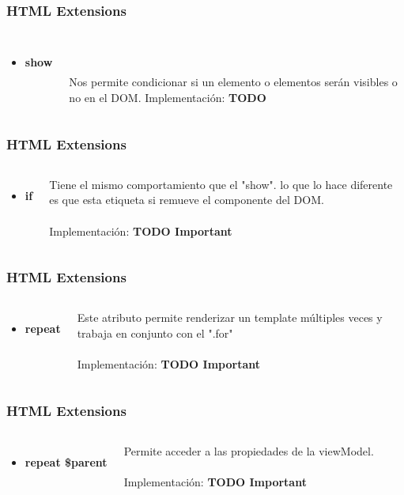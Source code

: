 \documentclass{beamer}
\begin{document}
\begin{frame}
\frametitle{HTML Extensions}
\begin{columns}[c]
\begin{itemize}
\item \textbf{show}
\end{itemize}
\\~\\
Nos permite condicionar si un elemento o elementos ser\'an visibles o no en el DOM.
Implementaci\'on: \textbf{TODO}
\end{columns}
\end{frame}
\begin{frame}
\frametitle{HTML Extensions}
\begin{columns}[c]
\begin{itemize}
\item \textbf{if}
\end{itemize}
Tiene el mismo comportamiento que el "show". lo que lo hace diferente es que esta etiqueta si remueve el componente del DOM.
\\~\\
Implementaci\'on: \textbf{TODO Important}
\end{columns}
\end{frame}
\begin{frame}
\frametitle{HTML Extensions}
\begin{columns}[c]
\begin{itemize}
\item \textbf{repeat}
\end{itemize}
Este atributo permite renderizar un template m\'ultiples veces y trabaja en conjunto con el ".for"
\\~\\
Implementaci\'on: \textbf{TODO Important}
\end{columns}
\end{frame}
\begin{frame}
\frametitle{HTML Extensions}
\begin{columns}[c]
\begin{itemize}
\item \textbf{repeat \$parent}
\end{itemize}
Permite acceder a las propiedades de la viewModel.
\\~\\
Implementaci\'on: \textbf{TODO Important}
\end{columns}
\end{frame}
\end{document}
